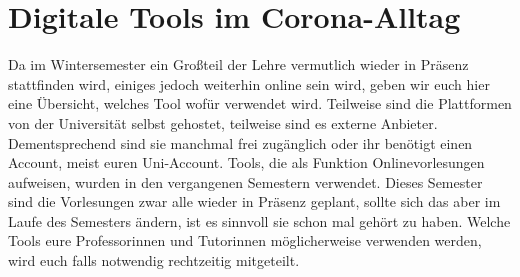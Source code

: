 \section{Digitale Tools im Corona-Alltag}

Da im Wintersemester ein Großteil der Lehre vermutlich wieder in Präsenz stattfinden wird, einiges jedoch weiterhin online sein wird, geben wir euch hier eine Übersicht, welches Tool wofür verwendet wird. Teilweise sind die Plattformen von der Universität selbst gehostet, teilweise sind es externe Anbieter. Dementsprechend sind sie manchmal frei zugänglich oder ihr benötigt einen Account, meist euren Uni-Account. Tools, die als Funktion Onlinevorlesungen aufweisen, wurden in den vergangenen Semestern verwendet. Dieses Semester sind die Vorlesungen zwar alle wieder in Präsenz geplant, sollte sich das aber im Laufe des Semesters ändern, ist es sinnvoll sie schon mal gehört zu haben.  Welche Tools eure Professorinnen und Tutorinnen möglicherweise verwenden werden, wird euch falls notwendig rechtzeitig mitgeteilt. 

